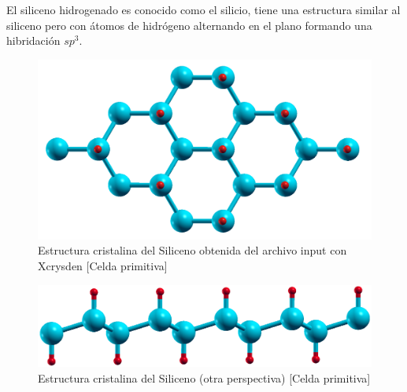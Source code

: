 
\vspace{0.5cm}

El siliceno hidrogenado es conocido como el silicio, tiene una estructura similar al siliceno pero 
con átomos de hidrógeno alternando en el plano formando una hibridación $sp^{3}$.

\vspace{0.5cm}

\begin{figure}[H]
    \centering
    \includegraphics[scale=0.3]{images_silicano/silicano_structure.png}
    \caption{Estructura cristalina del Siliceno obtenida del archivo input con Xcrysden [Celda primitiva]}
\end{figure}

\vspace{0.5cm}

\begin{figure}[H]
    \centering
    \includegraphics[scale=0.3]{images_silicano/silicano_structure_2.png}
    \caption{Estructura cristalina del Siliceno (otra perspectiva) [Celda primitiva]}
\end{figure}

